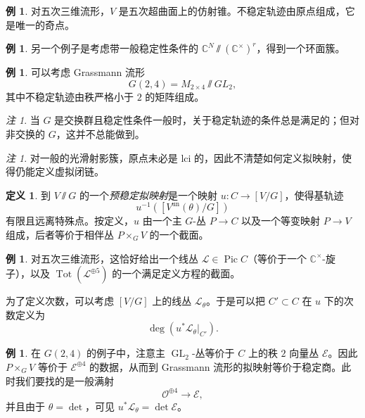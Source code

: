 \documentclass{amsart}
\theoremstyle{definition}
\newtheorem{defn}[thm]{定义}
\newtheorem{exm}[thm]{例}
\theoremstyle{remark}
\newtheorem{rmk}[thm]{注}
\theoremstyle{plain}
\theoremstyle{definition}
\theoremstyle{remark}
\newcommand{\C}{\mathbb{C}}
\newcommand{\mc}[1]{\mathcal{#1}}
\newcommand{\mr}[1]{\mathrm{#1}}
\newcommand{\on}[1]{\operatorname{#1}}
\newcommand{\1}{\mathbf{1}}
\newcommand{\2}{\mathbf{2}}
\newcommand{\3}{\mathbf{3}}
\DeclareMathOperator{\Pic}{Pic}
\begin{document}
\begin{exm}
    对五次三维流形，\(V\) 是五次超曲面上的仿射锥。不稳定轨迹由原点组成，它是唯一的奇点。
\end{exm}

\begin{exm}
    另一个例子是考虑带一般稳定性条件的 \(\C^N \sslash (\C^{\times})^r\)，得到一个环面簇。
\end{exm}

\begin{exm}
    可以考虑 Grassmann 流形
    \[ G(2,4) = M_{2\times 4} \sslash GL_2, \]
    其中不稳定轨迹由秩严格小于 \(2\) 的矩阵组成。
\end{exm}

\begin{rmk}
    当 \(G\) 是交换群且稳定性条件一般时，关于稳定轨迹的条件总是满足的；但对非交换的 \(G\)，这并不总能做到。
\end{rmk}

\begin{rmk}
    对一般的光滑射影簇，原点未必是 lci 的，因此不清楚如何定义拟映射，使得仍能定义虚拟闭链。
\end{rmk}

\begin{defn}
    到 \(V \sslash G\) 的一个\textit{预稳定拟映射}是一个映射 \(u \colon C \to [V/G]\)，使得基轨迹
    \[ u^{-1}([V^{\mr{un}}(\theta) / G]) \]
    有限且远离特殊点。按定义，\(u\) 由一个主 \(G\)-丛 \(P \to C\) 以及一个等变映射 \(P \to V\) 组成，后者等价于相伴丛 \(P \times_G V\) 的一个截面。
\end{defn}

\begin{exm}
    对五次三维流形，这恰好给出一个线丛 \(\mc{L} \in \Pic C\)（等价于一个 \(\C^{\times}\)-旋子），以及 \(\on{Tot}(\mc{L}^{\oplus 5})\) 的一个满足定义方程的截面。
\end{exm}

为了定义次数，可以考虑 \([V/G]\) 上的线丛 \(\mc{L}_{\theta}\)。于是可以把 \(C' \subset C\) 在 \(u\) 下的次数定义为
\[ \deg (u^* \mc{L}_{\theta}|_{C'}). \]

\begin{exm}
    在 \(G(2,4)\) 的例子中，注意主 \(\on{GL}_2\)-丛等价于 \(C\) 上的秩 \(2\) 向量丛 \(\mc{E}\)。因此 \(P \times_G V\) 等价于 \(\mc{E}^{\oplus 4}\) 的数据，从而到 Grassmann 流形的拟映射等价于稳定商。此时我们要找的是一般满射
    \[ \mc{O}^{\oplus 4} \to \mc{E}, \]
    并且由于 \(\theta = \det\)，可见 \(u^* \mc{L}_{\theta} = \det \mc{E}\)。
\end{exm}
\end{document}

